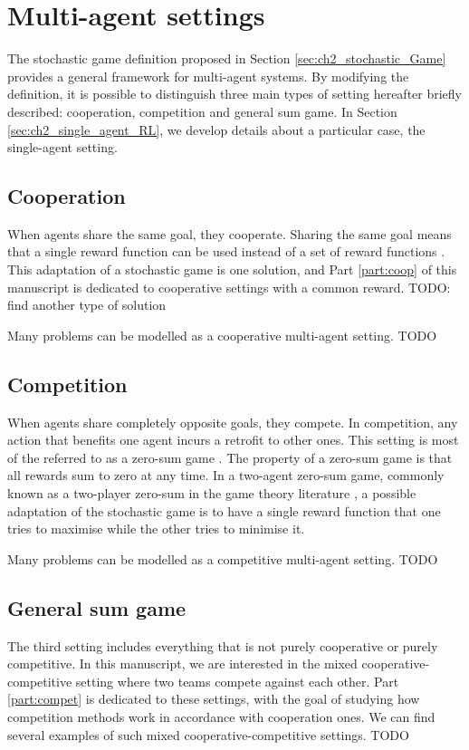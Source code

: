 \section{Multi-agent settings} 
\label{sec:ch2_multi_agent_settings}
The stochastic game definition proposed in Section \ref{sec:ch2_stochastic_Game} provides a general framework for multi-agent systems.
By modifying the definition, it is possible to distinguish three main types of setting hereafter briefly described: cooperation, competition and general sum game.
In Section \ref{sec:ch2_single_agent_RL}, we develop details about a particular case, the single-agent setting.

\subsection{Cooperation} 
\label{sec:ch2_Cooperation}
When agents share the same goal, they cooperate.
Sharing the same goal means that a single reward function can be used instead of a set of reward functions \citep{}.
This adaptation of a stochastic game is one solution, and Part \ref{part:coop} of this manuscript is dedicated to cooperative settings with a common reward.
TODO: find another type of solution

Many problems can be modelled as a cooperative multi-agent setting.
TODO

\subsection{Competition} 
\label{sec:ch2_Competition}
When agents share completely opposite goals, they compete.
In competition, any action that benefits one agent incurs a retrofit to other ones.
This setting is most of the referred to as a zero-sum game \citep{}.
The property of a zero-sum game is that all rewards sum to zero at any time.
In a two-agent zero-sum game, commonly known as a two-player zero-sum in the game theory literature \citep{}, a possible adaptation of the stochastic game is to have a single reward function that one tries to maximise while the other tries to minimise it.

Many problems can be modelled as a competitive multi-agent setting.
TODO



\subsection{General sum game} 
\label{sec:ch2_general_sum_game}
The third setting includes everything that is not purely cooperative or purely competitive.
In this manuscript, we are interested in the mixed cooperative-competitive setting where two teams compete against each other.
Part \ref{part:compet} is dedicated to these settings, with the goal of studying how competition methods work in accordance with cooperation ones.
We can find several examples of such mixed cooperative-competitive settings.
TODO

